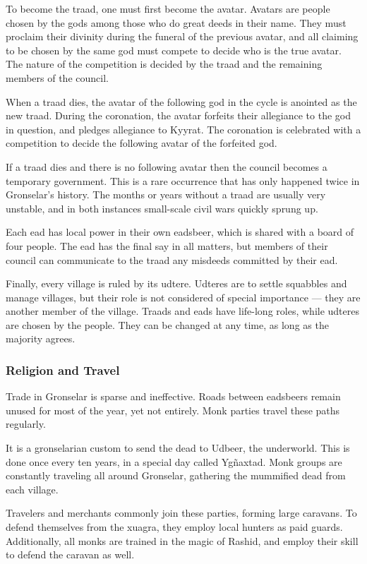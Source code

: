 To become the traad, one must first become the avatar.
Avatars are people chosen by the gods among those who do great deeds in their name.
They must proclaim their divinity during the funeral of the previous avatar, and all claiming to be chosen by the same god must compete to decide who is the true avatar.
The nature of the competition is decided by the traad and the remaining members of the council.

When a traad dies, the avatar of the following god in the cycle is anointed as the new traad.
During the coronation, the avatar forfeits their allegiance to the god in question, and pledges allegiance to Kyyrat.
The coronation is celebrated with a competition to decide the following avatar of the forfeited god.

If a traad dies and there is no following avatar then the council becomes a temporary government.
This is a rare occurrence that has only happened twice in Gronselar's history.
The months or years without a traad are usually very unstable, and in both instances small-scale civil wars quickly sprung up.

Each ead has local power in their own eadsbeer, which is shared with a board of four people.
The ead has the final say in all matters, but members of their council can communicate to the traad any misdeeds committed by their ead.

Finally, every village is ruled by its udtere.
Udteres are to settle squabbles and manage villages, but their role is not considered of special importance --- they are another member of the village.
Traads and eads have life-long roles, while udteres are chosen by the people.
They can be changed at any time, as long as the majority agrees.

\subsubsection{Religion and Travel}
Trade in Gronselar is sparse and ineffective.
Roads between eadsbeers remain unused for most of the year, yet not entirely.
Monk parties travel these paths regularly.

It is a gronselarian custom to send the dead to Udbeer, the underworld.
This is done once every ten years, in a special day called Yg\~naxtad.
Monk groups are constantly traveling all around Gronselar, gathering the mummified dead from each village.

Travelers and merchants commonly join these parties, forming large caravans.
To defend themselves from the xuagra, they employ local hunters as paid guards.
Additionally, all monks are trained in the magic of Rashid, and employ their skill to defend the caravan as well.

